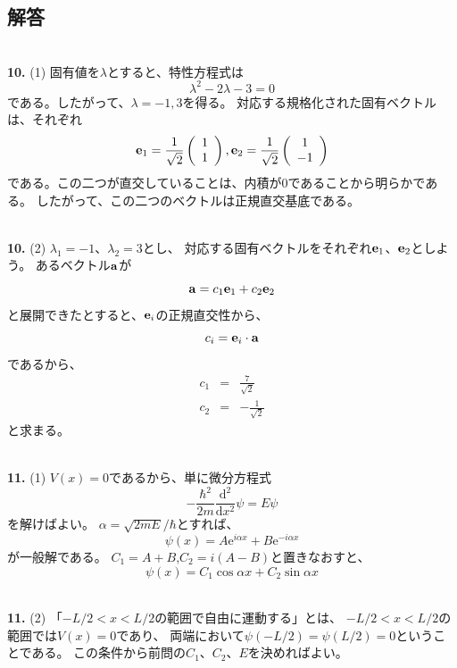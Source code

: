 \documentclass{jarticle}
\newcommand{\diff}{\mathrm d}
\newcommand{\ans}[2]{\noindent\\ {\bf \large #1.} (#2)}
\newcommand{\e}{\mathrm e}
\begin{document}
\subsection{解答}

\ans{10}{1}
固有値を$\lambda$とすると、特性方程式は
\begin{equation}
  \lambda^2 - 2 \lambda -3 = 0
\end{equation}
である。したがって、$\lambda = -1,3$を得る。
対応する規格化された固有ベクトルは、それぞれ
\begin{equation}
  {\bf e}_1 =
  \frac{1}{\sqrt{2}}
  \left(
  \begin{array}{c}
      1 \\ 1
    \end{array}
  \right)
  ,
  {\bf e}_2 =
  \frac{1}{\sqrt{2}}
  \left(
  \begin{array}{c}
      1 \\ -1
    \end{array}
  \right)
\end{equation}
である。この二つが直交していることは、内積が$0$であることから明らかである。
したがって、この二つのベクトルは正規直交基底である。

\ans{10}{2}
$\lambda_1 = -1$、$\lambda_2 = 3$とし、
対応する固有ベクトルをそれぞれ${\bf e}_1$、${\bf e}_2$としよう。
あるベクトル${\bf a}$が
$$
  {\bf a} = c_1 {\bf e}_1 +c_2 {\bf e}_2
$$
と展開できたとすると、${\bf e}_i$の正規直交性から、
$$
  c_i = {\bf e}_i \cdot {\bf a}
$$
であるから、
\begin{eqnarray}
  c_1 &=& \frac{7}{\sqrt{2}}\\
  c_2 &=& -\frac{1}{\sqrt{2}}
\end{eqnarray}
と求まる。

\ans{11}{1}
$V(x)=0$であるから、単に微分方程式
\begin{equation}
  -\frac{\hbar^2}{2m} \frac{\diff^2}{\diff x^2} \psi = E \psi
\end{equation}
を解けばよい。
$\alpha = \sqrt{2mE}/\hbar$とすれば、
\begin{equation}
  \psi(x) = A \e^{i \alpha x} + B \e^{- i \alpha x}
\end{equation}
が一般解である。
$C_1 = A+B$,$C_2 = i(A-B)$と置きなおすと、
\begin{equation}
  \psi(x) = C_1 \cos{\alpha x} + C_2 \sin{\alpha x}
\end{equation}



\ans{11}{2}
「$-L/2<  x < L/2$の範囲で自由に運動する」とは、
$-L/2<  x < L/2$の範囲では$V(x)=0$であり、
両端において$\psi(-L/2) = \psi(L/2) = 0$ということである。
この条件から前問の$C_1$、$C_2$、$E$を決めればよい。
\end{document}
